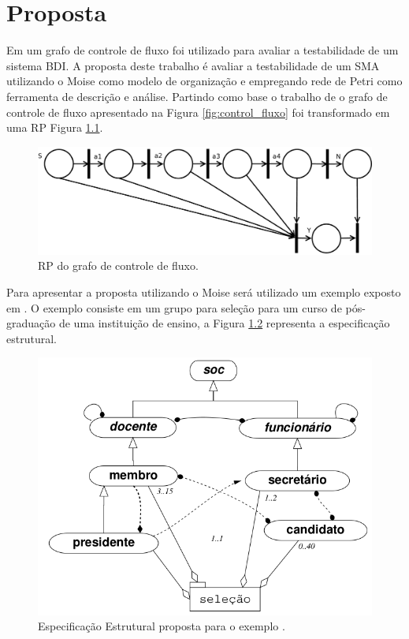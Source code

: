 \chapter{Proposta}

	Em \cite{winikoff2014testability} um grafo de controle de fluxo foi utilizado para avaliar a testabilidade de um sistema BDI. A proposta deste trabalho é avaliar a testabilidade de um SMA utilizando o Moise como modelo de organização e empregando rede de Petri como ferramenta de descrição e análise. Partindo como base o trabalho de \cite{winikoff2017bdi} o grafo de controle de fluxo apresentado na Figura \ref{fig:control_fluxo} foi transformado em uma RP Figura \ref{fig:cf_rp}.

\begin{figure}[ht]
\centering
\includegraphics[scale=0.4]{imagens/cf_rp.pdf}
\caption{RP do grafo de controle de fluxo.}
\label{fig:cf_rp}
\end{figure}
    

  Para apresentar a proposta utilizando o Moise será utilizado um exemplo exposto em \cite{hubner2003modelo}. O exemplo consiste em um grupo para seleção para um curso de pós-graduação de uma instituição de ensino, a Figura \ref{fig:ee_exemplo} representa a especificação estrutural.
  
\begin{figure}[ht]
\centering
\includegraphics[scale=0.4]{imagens/modelo2.png}
\caption{Especificação Estrutural proposta para o exemplo \cite{hubner2003modelo}.}
\label{fig:ee_exemplo}
\end{figure}
  
